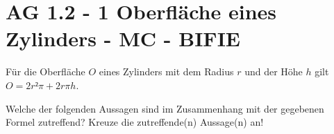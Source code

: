 \section{AG 1.2 - 1 Oberfläche eines Zylinders - MC - BIFIE}

\begin{beispiel}[AG 1.2]{1} %
				Für die Oberfläche $O$ eines Zylinders mit dem Radius $r$ und der Höhe $h$ gilt $O=2r²\pi+2r\pi h$.
				
				Welche der folgenden Aussagen sind im Zusammenhang mit der gegebenen Formel zutreffend? Kreuze die zutreffende(n) Aussage(n) an!
\end{beispiel}